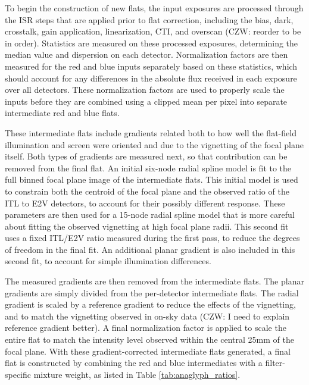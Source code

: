To begin the construction of new flats, the input exposures are processed through the ISR steps that are applied prior to flat correction, including the bias, dark, crosstalk, gain application, linearization, CTI, and overscan (CZW: reorder to be in order).
Statistics are measured on these processed exposures, determining the median value and dispersion on each detector.
Normalization factors are then measured for the red and blue inputs separately based on these statistics, which should account for any differences in the absolute flux received in each exposure over all detectors.
These normalization factors are used to properly scale the inputs before they are combined using a clipped mean per pixel into separate intermediate red and blue flats.

These intermediate flats include gradients related both to how well the flat-field illumination and screen were oriented and due to the vignetting of the focal plane itself.
Both types of gradients are measured next, so that contribution can be removed from the final flat.
An initial six-node radial spline model is fit to the full binned focal plane image of the intermediate flats.
This initial model is used to constrain both the centroid of the focal plane and the observed ratio of the ITL to E2V detectors, to account for their possibly different response.
These parameters are then used for a 15-node radial spline model that is more careful about fitting the observed vignetting at high focal plane radii.
This second fit uses a fixed ITL/E2V ratio measured during the first pass, to reduce the degrees of freedom in the final fit.
An additional planar gradient is also included in this second fit, to account for simple illumination differences.

The measured gradients are then removed from the intermediate flats.
The planar gradients are simply divided from the per-detector intermediate flats.
The radial gradient is scaled by a reference gradient to reduce the effects of the vignetting, and to match the vignetting observed in on-sky data (CZW: I need to explain reference gradient better).
A final normalization factor is applied to scale the entire flat to match the intensity level observed within the central 25mm of the focal plane.
With these gradient-corrected intermediate flats generated, a final flat is constructed by combining the red and blue intermediates with a filter-specific mixture weight, as listed in Table \ref{tab:anaglyph_ratios}.

